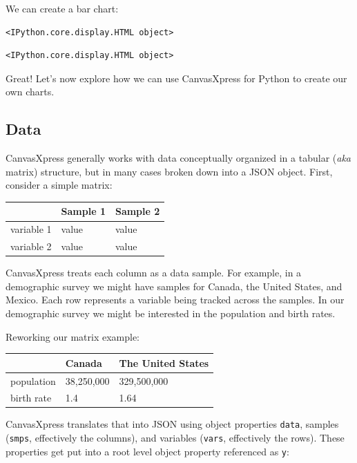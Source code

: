 \documentclass[
  letterpaper,
  DIV=11,
  numbers=noendperiod]{scrartcl}
\begin{document}
We can create a bar chart:

\begin{verbatim}
<IPython.core.display.HTML object>
\end{verbatim}

\begin{verbatim}
<IPython.core.display.HTML object>
\end{verbatim}

Great! Let's now explore how we can use CanvasXpress for Python to
create our own charts.

\hypertarget{data}{%
\subsection{Data}\label{data}}

CanvasXpress generally works with data conceptually organized in a
tabular (\emph{aka} matrix) structure, but in many cases broken down
into a JSON object. First, consider a simple matrix:

\begin{longtable}[]{@{}lll@{}}
\toprule\noalign{}
& Sample 1 & Sample 2 \\
\midrule\noalign{}
\endhead
\bottomrule\noalign{}
\endlastfoot
variable 1 & value & value \\
variable 2 & value & value \\
\end{longtable}

CanvasXpress treats each column as a data sample. For example, in a
demographic survey we might have samples for Canada, the United States,
and Mexico. Each row represents a variable being tracked across the
samples. In our demographic survey we might be interested in the
population and birth rates.

Reworking our matrix example:

\begin{longtable}[]{@{}lll@{}}
\toprule\noalign{}
& Canada & The United States \\
\midrule\noalign{}
\endhead
\bottomrule\noalign{}
\endlastfoot
population & 38,250,000 & 329,500,000 \\
birth rate & 1.4 & 1.64 \\
\end{longtable}

CanvasXpress translates that into JSON using object properties
\texttt{data}, samples (\texttt{smps}, effectively the columns), and
variables (\texttt{vars}, effectively the rows). These properties get
put into a root level object property referenced as \texttt{y}:
\end{document}
